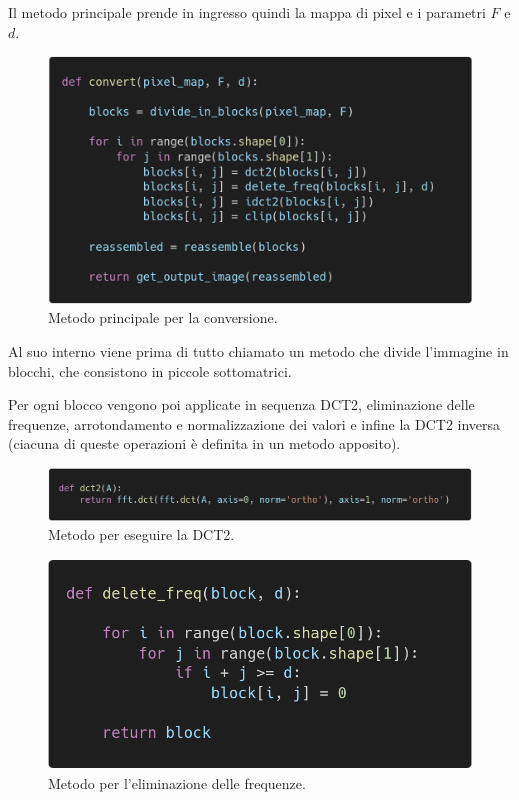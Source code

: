 \documentclass[12pt]{article}
\begin{document}
Il metodo principale prende in ingresso quindi la mappa di pixel e i parametri $F$ e $d$. 

\begin{figure}[!ht]
    \begin{center}
    \includegraphics[scale=0.3]{images/code_convert.png}
    \caption{Metodo principale per la conversione.}
    \end{center}
\end{figure}

Al suo interno viene prima di tutto chiamato un metodo che divide l'immagine in blocchi, che consistono in piccole sottomatrici.

Per ogni blocco vengono poi applicate in sequenza DCT2, eliminazione delle frequenze, arrotondamento e normalizzazione dei valori e infine la DCT2 inversa (ciacuna di queste operazioni è definita in un metodo apposito).

\begin{figure}[!ht]
    \begin{center}
    \includegraphics[scale=0.3]{images/code_dct2.png}
    \caption{Metodo per eseguire la DCT2.}
    \end{center}
\end{figure}

\begin{figure}[!ht]
    \begin{center}
    \includegraphics[scale=0.3]{images/code_delete_freq.png}
    \caption{Metodo per l'eliminazione delle frequenze.}
    \end{center}
\end{figure}
\end{document}
